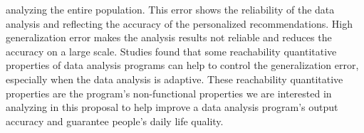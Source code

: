analyzing the entire population.
This error shows the reliability of the data analysis and reflecting the accuracy of the personalized recommendations.
High generalization error makes the analysis results
not reliable and reduces the accuracy on a large scale.
Studies found that some reachability quantitative properties of data analysis programs can help to control the generalization error, especially when the data analysis is adaptive.
These reachability quantitative properties are the 
program's non-functional properties
we are interested in
analyzing in this proposal to help improve a data analysis program's output accuracy and guarantee people's daily life quality.

